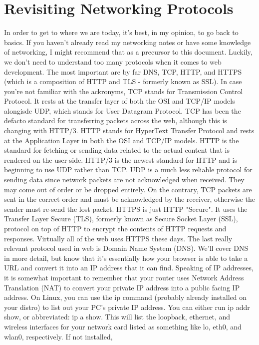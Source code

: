 \documentclass{article}
\begin{document}
\section{Revisiting Networking Protocols}

In order to get to where we are today, it's best, in my opinion, to go back to basics. If you haven't already 
read my networking notes or have some knowledge of networking, I might recommend that as a precursor to this 
document. Luckily, we don't need to understand too many protocols when it comes to web development. The most 
important are by far DNS, TCP, HTTP, and HTTPS (which is a composition of HTTP and TLS - formerly known as SSL). 
In case you're not familiar with the ackronyms, TCP stands for Transmission Control Protocol. It rests at the 
transfer layer of both the OSI and TCP/IP models alongisde UDP, which stands for User Datagram Protocol. TCP 
has been the defacto standard for transferring packets across the web, although this is changing with HTTP/3. 
HTTP stands for HyperText Transfer Protocol and rests at the Application Layer in both the OSI and TCP/IP 
models. HTTP is the standard for fetching or sending data related to the actual content that is rendered on the 
user-side. HTTP/3 is the newest standard for HTTP and is beginning to use UDP rather than TCP. UDP is a much 
less reliable protocol for sending data since network packets are not acknowledged when received. They may come 
out of order or be dropped entirely. On the contrary, TCP packets are sent in the correct order and must be 
acknowledged by the receiver, otherwise the sender must re-send the lost packet. HTTPS is just HTTP "Secure". 
It uses the Transfer Layer Secure (TLS), formerly known as Secure Socket Layer (SSL), protocol on top of HTTP 
to encrypt the contents of HTTP requests and responses. Virtually all of the web uses HTTPS these days. The 
last really relevant protocol used in web is Domain Name System (DNS). We'll cover DNS in more detail, but know 
that it's essentially how your browser is able to take a URL and convert it into an IP address that it can 
find. Speaking of IP addresses, it is somewhat important to remember that your router uses Network Address 
Translation (NAT) to convert your private IP address into a public facing IP address. On Linux, you can use the 
ip command (probably already installed on your distro) to list out your PC's private IP address. You can 
either run ip addr show, or abbreviated: ip a show. This will list the loopback, ethernet, and wireless 
interfaces for your network card listed as something like lo, eth0, and wlan0, respectively. If not installed, 
\end{document}
